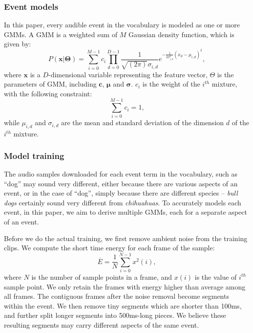 \subsubsection{Event models}
In this paper, every audible event in the vocabulary is modeled as one or
more GMMs. A GMM is a weighted sum of $M$ Gaussian density function, 
which is given by:
\begin{equation}
P(\mathbf{x}|\mathbf{\Theta}) = \sum_{i = 0}^{M - 1} c_i\prod_{d=0}^{D-1} \frac{1}{\sqrt{(2\pi)}\sigma_{i,d}}e^{-\frac{1}{2\sigma_{i,d}^{2}}(x_d-\mu_{i,d})^2},
\label{eqn:gmm}
\end{equation}
where $\mathbf{x}$ is a $D$-dimensional variable representing
the feature vector, $\Theta$ is the parameters of GMM, 
including $\mathbf{c}$, $\mathbf{\mu}$ and $\mathbf{\sigma}$.
$c_i$ is the weight of the $i^{th}$ mixture, with the following constraint:
\begin{equation}
\sum_{i=0}^{M-1}c_i=1,
\end{equation}
while $\mu_{i,d}$ and $\sigma_{i,d}$ are the mean and standard deviation 
of the dimension $d$ of the $i^{th}$ mixture.

\subsubsection{Model training}
The audio samples downloaded for each event term in the vocabulary, 
such as ``dog'' may sound very different, either because there are various
aspects of an event, or in the case of ``dog'', simply because there are
different species -- {\em bull dogs} certainly sound very 
different from {\em chihuahuas}.
To accurately models each event, in this paper, we aim to derive multiple
GMMs, each for a separate aspect of an event. 

Before we do the actual training, we first remove ambient noise from
the training clips. We compute the short time energy \cite{1181092} 
for each frame of the sample:
\begin{equation}
\overline{E} = \frac{1}{N}\sum_{i=0}^{N-1}x^2(i),
\label{eqn:en}
\end{equation}
where $N$ is the number of sample points in a frame, 
and $x(i)$ is the value of $i^{th}$ sample point. 
We only retain the frames with energy higher than average among all
frames. The contiguous frames after the noise removal become segments
within the event. We then remove tiny segments which are shorter than 100ms,
and further split longer segments into 500ms-long pieces.
We believe these resulting segments may carry different
aspects of the same event.

